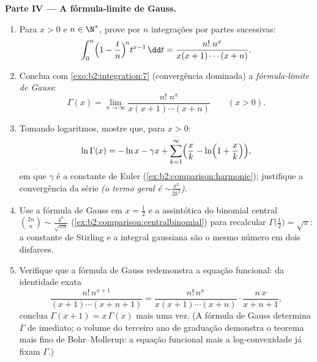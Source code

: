 \begin{problem}
\medskip
\noindent\textbf{Parte IV --- A fórmula-limite de Gauss.}
\begin{enumerate}[resume]
  \item Para $x > 0$ e $n \in \N^*$, prove por $n$ integrações
        por partes sucessivas:
        \[
        \int_0^n \Bigl(1 - \frac tn\Bigr)^{\!n} t^{x-1}\,\dd t
        = \frac{n!\;n^x}{x(x+1)\cdots(x+n)} .
        \]
  \item Conclua com \cref{exo:b2:integration:7} (convergência
        dominada) a \emph{fórmula-limite de Gauss}:
        \[
        \Gamma(x) = \lim_{n\to\infty}
        \frac{n!\;n^x}{x(x+1)\cdots(x+n)}
        \qquad (x > 0).
        \]
  \item Tomando logaritmos, mostre que, para $x > 0$:
        \[
        \ln\Gamma(x) = -\ln x - \gamma x +
        \sum_{k=1}^{\infty}\Bigl(\frac xk -
        \ln\Bigl(1 + \frac xk\Bigr)\Bigr),
        \]
        em que $\gamma$ é a constante de Euler
        (\cref{ex:b2:comparison:harmonic}); justifique a
        convergência da série \emph{(o termo geral é
        $\sim \frac{x^2}{2k^2}$)}.
  \item Use a fórmula de Gauss em $x = \frac12$ e a assintótica do
        binomial central $\binom{2n}{n} \sim
        \frac{4^n}{\sqrt{\pi n}}$
        (\cref{ex:b2:comparison:centralbinomial}) para recalcular
        $\Gamma\bigl(\frac12\bigr) = \sqrt\pi$: a constante de Stirling
        e a integral gaussiana são o mesmo número
        em dois disfarces.
  \item Verifique que a fórmula de Gauss redemonstra a equação
        funcional: da identidade exata
        \[
        \frac{n!\,n^{x+1}}{(x+1)\cdots(x+n+1)}
        = \frac{n!\,n^{x}}{x(x+1)\cdots(x+n)}\cdot
        \frac{n\,x}{x+n+1},
        \]
        conclua $\Gamma(x+1) = x\,\Gamma(x)$ mais uma vez. (A fórmula de
        Gauss determina $\Gamma$ de imediato; o volume do terceiro ano de graduação
        demonstra o teorema mais fino de Bohr--Mollerup: a
        equação funcional mais a log-convexidade já fixam
        $\Gamma$.)
\end{enumerate}


\end{problem}
